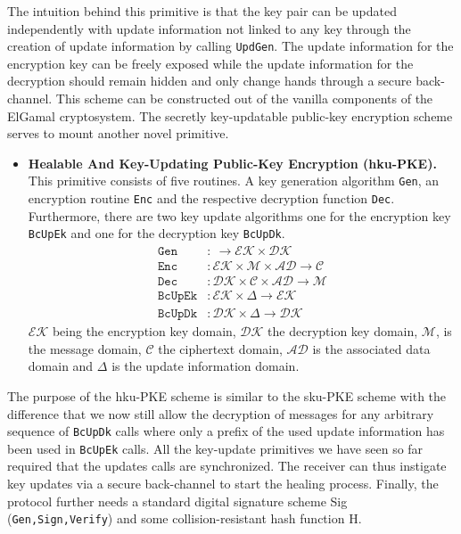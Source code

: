 \documentclass[11pt,a4paper,twoside,openright,bibliography=totoc]{scrbook}
\begin{document}
The intuition behind this primitive is that the key pair can be
updated independently with update information not linked to any
key through the creation of update information by calling
\texttt{UpdGen}. The update information for the encryption key can be freely
exposed while the update information for the decryption should
remain hidden and only change hands through a secure back-channel.
This scheme can be constructed out of the vanilla components
of the ElGamal cryptosystem. The secretly key-updatable public-key
encryption scheme serves to mount another novel primitive.
\begin{itemize}
\item \textbf{Healable And Key-Updating Public-Key Encryption (hku-PKE).} This
  primitive consists of five routines. A key generation algorithm \texttt{Gen},
  an encryption routine \texttt{Enc} and the respective decryption function
  \texttt{Dec}. Furthermore, there are two key update algorithms one
  for the encryption key \texttt{BcUpEk} and one for the decryption key \texttt{BcUpDk}.
  \begin{align*}
    \texttt{Gen} & : \ \rightarrow \mathcal{EK} \times \mathcal{DK} \\
    \texttt{Enc} & : \mathcal{EK} \times \mathcal{M} \times \mathcal{AD}
                   \rightarrow \mathcal{C} \\
    \texttt{Dec} & : \mathcal{DK} \times \mathcal{C} \times \mathcal{AD}
                   \rightarrow \mathcal{M} \\
    \texttt{BcUpEk} & : \mathcal{EK} \times \Delta \rightarrow \mathcal{EK} \\
    \texttt{BcUpDk} & : \mathcal{DK} \times \Delta \rightarrow \mathcal{DK}
  \end{align*}
  $\mathcal{EK}$ being the encryption key domain, $\mathcal{DK}$ the decryption
  key domain, $\mathcal{M}$, is the message domain, $\mathcal{C}$ the ciphertext
  domain, $\mathcal{AD}$ is the associated data domain
  and $\Delta$ is the update information domain.
\end{itemize}

The purpose of the hku-PKE scheme is similar to the sku-PKE scheme with the difference
that we now still allow the decryption of messages for any arbitrary sequence
of \texttt{BcUpDk} calls where only a prefix of the used update information
has been used in \texttt{BcUpEk} calls. All the key-update primitives
we have seen so far required that the updates calls are synchronized. The receiver can thus
instigate key updates via a secure back-channel to start the healing process.
Finally, the protocol further needs a standard digital signature scheme Sig
(\texttt{Gen,Sign,Verify}) and some collision-resistant hash function H.
\end{document}
